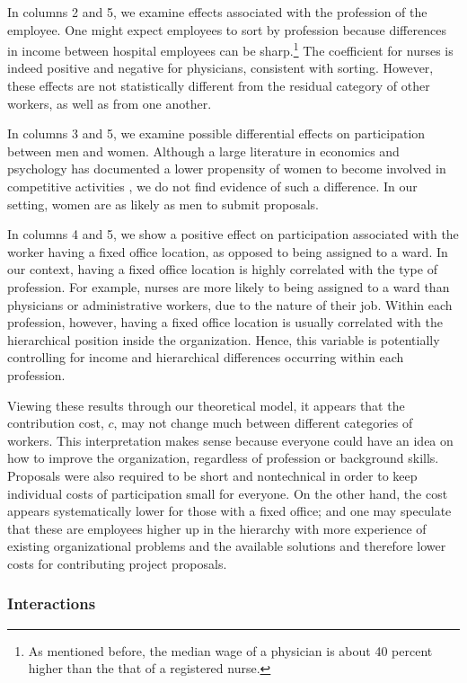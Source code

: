 \documentclass[12pt, titlepage]{article}
\begin{document}
In columns 2 and 5, we examine effects associated with the profession of
the employee. One might expect employees to sort by profession because
differences in income between hospital employees can be sharp.\footnote{As
  mentioned before, the median wage of a physician is about 40 percent
  higher than the that of a registered nurse.} The coefficient for
nurses is indeed positive and negative for physicians, consistent with
sorting. However, these effects are not statistically different from the
residual category of other workers, as well as from one another.

In columns 3 and 5, we examine possible differential effects on
participation between men and women. Although a large literature in
economics and psychology \citep{croson2009gender} has documented a lower
propensity of women to become involved in competitive activities
\citep{niederle2007women}, we do not find evidence of such a difference.
In our setting, women are as likely as men to submit proposals.

In columns 4 and 5, we show a positive effect on participation
associated with the worker having a fixed office location, as opposed to
being assigned to a ward. In our context, having a fixed office location
is highly correlated with the type of profession. For example, nurses
are more likely to being assigned to a ward than physicians or
administrative workers, due to the nature of their job. Within each
profession, however, having a fixed office location is usually
correlated with the hierarchical position inside the organization.
Hence, this variable is potentially controlling for income and
hierarchical differences occurring within each profession.

Viewing these results through our theoretical model, it appears that the
contribution cost, \(c\), may not change much between different
categories of workers. This interpretation makes sense because everyone
could have an idea on how to improve the organization, regardless of
profession or background skills. Proposals were also required to be
short and nontechnical in order to keep individual costs of
participation small for everyone. On the other hand, the cost appears
systematically lower for those with a fixed office; and one may
speculate that these are employees higher up in the hierarchy with more
experience of existing organizational problems and the available
solutions and therefore lower costs for contributing project proposals.

\subsubsection{Interactions}\label{interactions}
\end{document}
